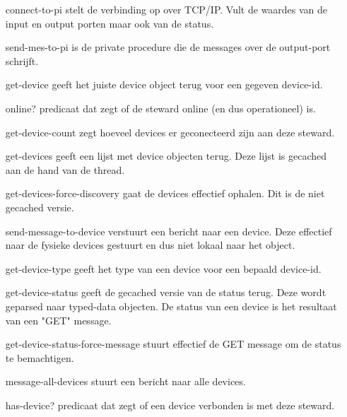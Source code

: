 \documentclass{article}
\begin{document}
\begin{itemize}
  	\item[connect-to-pi] stelt de verbinding op over TCP/IP. Vult de waardes van de input en output porten maar ook van de status.
  	\item[send-mes-to-pi] is de private procedure die de messages over de output-port schrijft.
  	\item[get-device] geeft het juiste device object terug voor een gegeven device-id.
  	\item[online?] predicaat dat zegt of de steward online (en dus operationeel) is.
  	\item[get-device-count] zegt hoeveel devices er geconecteerd zijn aan deze steward.
  	\item[get-devices] geeft een lijst met device objecten terug. Deze lijst is gecached aan de hand van de thread.
  	\item[get-devices-force-discovery] gaat de devices effectief ophalen. Dit is de niet gecached versie.
  	\item[send-message-to-device] verstuurt een bericht naar een device. Deze effectief naar de fysieke devices gestuurt en dus niet lokaal naar het object.
  	\item[get-device-type] geeft het type van een device voor een bepaald device-id.
  	\item[get-device-status] geeft de gecached versie van de status terug. Deze wordt geparsed naar typed-data objecten. De status van een device is het  resultaat van een "GET" message.
  	\item[get-device-status-force-message] stuurt effectief de GET message om de status te bemachtigen.
  	\item[message-all-devices] stuurt een bericht naar alle devices.
  	\item[has-device?] predicaat dat zegt of een device verbonden is met deze steward.
\end{itemize}
\end{document}
